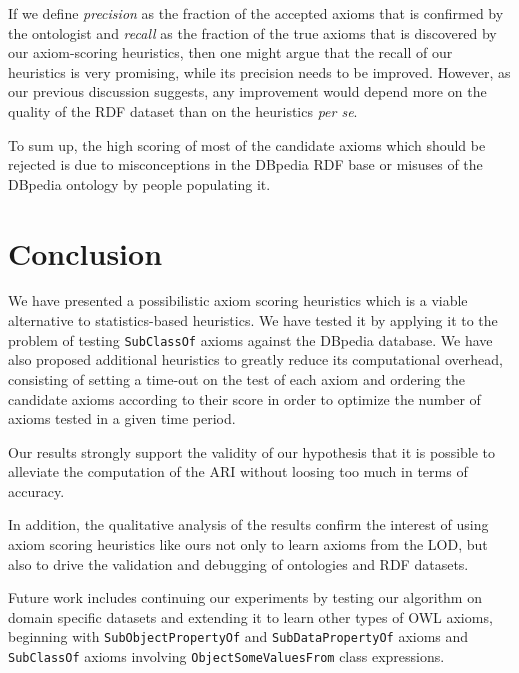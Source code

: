 \documentclass{llncs}
\begin{document}
If we define \emph{precision} as the fraction of the accepted axioms that is confirmed by the ontologist
and \emph{recall} as the fraction of the true axioms that is discovered by our axiom-scoring heuristics,
then one might argue that the recall of our heuristics is very promising,
while its precision needs to be improved.
However, as our previous discussion suggests, any improvement would depend more on the quality
of the RDF dataset than on the heuristics \emph{per se}.


To sum up, 
the high scoring of most of the candidate axioms which should be rejected
is due to misconceptions in the DBpedia RDF base or misuses of the DBpedia ontology by people populating it.




\section{Conclusion}\label{conclusion}

We have presented a possibilistic axiom scoring heuristics which is a viable
alternative to statistics-based heuristics. We have tested it by applying it to the
problem of testing \texttt{SubClassOf} axioms against the DBpedia database.
We have also proposed additional heuristics to greatly reduce its computational
overhead, consisting of setting a time-out on the test of each axiom and ordering the candidate axioms according to their score in order to optimize the number of axioms tested in a given time period.

Our results strongly support the validity of our hypothesis
that it is possible to alleviate the computation of the ARI without loosing too much
in terms of accuracy.

In addition, the qualitative analysis of the results confirm the interest of using axiom scoring heuristics like ours
not only to learn axioms from the LOD, but also to drive the validation and debugging of ontologies and RDF datasets.

Future work includes continuing our experiments by testing our algorithm on domain specific datasets
and extending it to learn other types of OWL axioms, beginning with \texttt{SubObjectPropertyOf} and \texttt{SubDataPropertyOf} axioms and \texttt{SubClassOf} axioms involving \texttt{ObjectSomeValuesFrom} class expressions.






\end{document}
